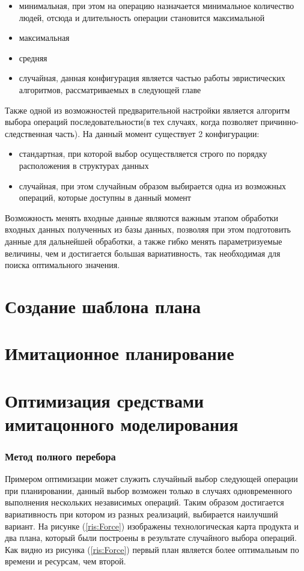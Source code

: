 \begin{itemize}
    \item минимальная, при этом на операцию назначается минимальное количество людей, отсюда и длительность операции становится максимальной
    \item максимальная
    \item средняя
    \item случайная, данная конфигурация является частью работы эвристических алгоритмов, рассматриваемых в следующей главе
\end{itemize}

Также одной из возможностей предварительной настройки является алгоритм выбора операций последовательности(в тех случаях, когда позволяет причинно-следственная часть). На данный момент существует 2 конфигурации:

\begin{itemize}
    \item стандартная, при которой выбор осуществляется строго по порядку расположения в структурах данных
    \item случайная, при этом случайным образом выбирается одна из возможных операций, которые доступны в данный момент 
\end{itemize}

Возможность менять входные данные являются важным этапом обработки входных данных полученных из базы данных, позволяя при этом подготовить данные для дальнейшей обработки, а также гибко менять параметризуемые величины, чем и достигается большая вариативность, так необходимая для поиска оптимального значения. 

\section{Создание шаблона плана}

\section{Имитационное планирование}

\section{Оптимизация средствами имитацонного моделирования}

\subsubsection{Метод полного перебора}
Примером оптимизации может служить случайный выбор следующей операции при планировании, данный выбор возможен только в случаях одновременного выполнения нескольких независимых операций. Таким образом достигается вариативность при котором из разных реализаций, выбирается наилучший вариант. На рисунке (\ref{ris:Force}) изображены технологическая карта продукта и два плана, который были построены в результате случайного выбора операций. Как видно из рисунка (\ref{ris:Force}) первый план является более оптимальным по времени и ресурсам, чем второй.

